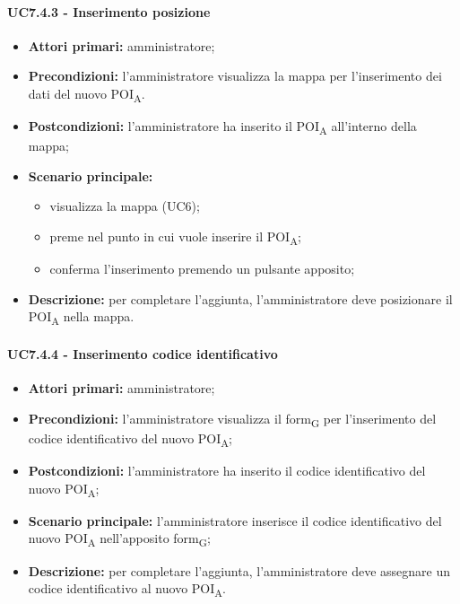 \paragraph{UC7.4.3 - Inserimento posizione}
\begin{itemize}
	\item 	\textbf{Attori primari:} amministratore;
	\item 	\textbf{Precondizioni:} l'amministratore visualizza la mappa per l'inserimento dei dati del nuovo POI\textsubscript{A}.
	\item 	\textbf{Postcondizioni:} l'amministratore ha inserito il POI\textsubscript{A} all'interno della mappa; 
	\item 	\textbf{Scenario principale:}
	\begin{itemize}
		\item visualizza la mappa (UC6);
		\item preme nel punto in cui vuole inserire il POI\textsubscript{A};
		\item conferma l'inserimento premendo un pulsante apposito;
	\end{itemize}
	\item 	\textbf{Descrizione:} per completare l'aggiunta, l'amministratore deve posizionare il POI\textsubscript{A} nella mappa.

\end{itemize}

\paragraph{UC7.4.4 - Inserimento codice identificativo}
\begin{itemize}
	\item 	\textbf{Attori primari:} amministratore;
	\item 	\textbf{Precondizioni:} l'amministratore visualizza il form\textsubscript{G} per l'inserimento del codice identificativo del nuovo POI\textsubscript{A};
	\item 	\textbf{Postcondizioni:} l'amministratore ha inserito il codice identificativo del nuovo POI\textsubscript{A}; 
	\item 	\textbf{Scenario principale:} l'amministratore inserisce il codice identificativo del nuovo POI\textsubscript{A} nell'apposito form\textsubscript{G};
	\item 	\textbf{Descrizione:} per completare l'aggiunta, l'amministratore deve assegnare un codice identificativo al nuovo POI\textsubscript{A}.

\end{itemize}

